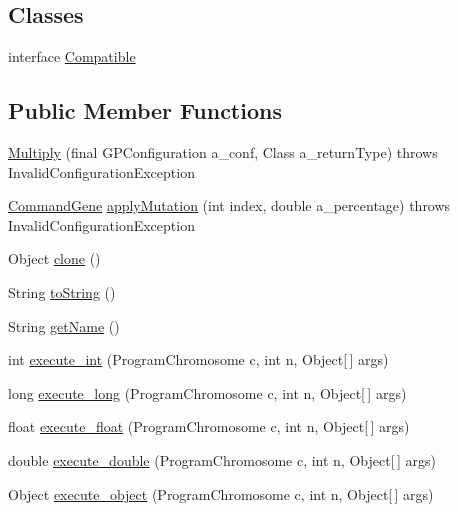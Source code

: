\subsection*{Classes}
\begin{DoxyCompactItemize}
\item 
interface \hyperlink{interfaceorg_1_1jgap_1_1gp_1_1function_1_1_multiply_1_1_compatible}{Compatible}
\end{DoxyCompactItemize}
\subsection*{Public Member Functions}
\begin{DoxyCompactItemize}
\item 
\hyperlink{classorg_1_1jgap_1_1gp_1_1function_1_1_multiply_a6f9057e8730b53151e40cd956702c8ab}{Multiply} (final G\-P\-Configuration a\-\_\-conf, Class a\-\_\-return\-Type)  throws Invalid\-Configuration\-Exception 
\item 
\hyperlink{classorg_1_1jgap_1_1gp_1_1_command_gene}{Command\-Gene} \hyperlink{classorg_1_1jgap_1_1gp_1_1function_1_1_multiply_a040f94653daf42243876c1149e0a7e7c}{apply\-Mutation} (int index, double a\-\_\-percentage)  throws Invalid\-Configuration\-Exception 
\item 
Object \hyperlink{classorg_1_1jgap_1_1gp_1_1function_1_1_multiply_ab1aad202b2d7882023cff3f289c3fcd9}{clone} ()
\item 
String \hyperlink{classorg_1_1jgap_1_1gp_1_1function_1_1_multiply_a899f290697c086849e65e7cf723e8b8e}{to\-String} ()
\item 
String \hyperlink{classorg_1_1jgap_1_1gp_1_1function_1_1_multiply_aca3bb4c59cf32e152e3c6aacc867a4c8}{get\-Name} ()
\item 
int \hyperlink{classorg_1_1jgap_1_1gp_1_1function_1_1_multiply_a97811f6c9ece802537ee0e58df6a849b}{execute\-\_\-int} (Program\-Chromosome c, int n, Object\mbox{[}$\,$\mbox{]} args)
\item 
long \hyperlink{classorg_1_1jgap_1_1gp_1_1function_1_1_multiply_ac3362fde81715b3dbe612b7f233bdc43}{execute\-\_\-long} (Program\-Chromosome c, int n, Object\mbox{[}$\,$\mbox{]} args)
\item 
float \hyperlink{classorg_1_1jgap_1_1gp_1_1function_1_1_multiply_a76a3da2e4deccbab63622d39669350ac}{execute\-\_\-float} (Program\-Chromosome c, int n, Object\mbox{[}$\,$\mbox{]} args)
\item 
double \hyperlink{classorg_1_1jgap_1_1gp_1_1function_1_1_multiply_a066768f23f3a5a08231d0b9f66988580}{execute\-\_\-double} (Program\-Chromosome c, int n, Object\mbox{[}$\,$\mbox{]} args)
\item 
Object \hyperlink{classorg_1_1jgap_1_1gp_1_1function_1_1_multiply_a2314d7ffaef5c63f07d46aef8e302844}{execute\-\_\-object} (Program\-Chromosome c, int n, Object\mbox{[}$\,$\mbox{]} args)
\end{DoxyCompactItemize}
